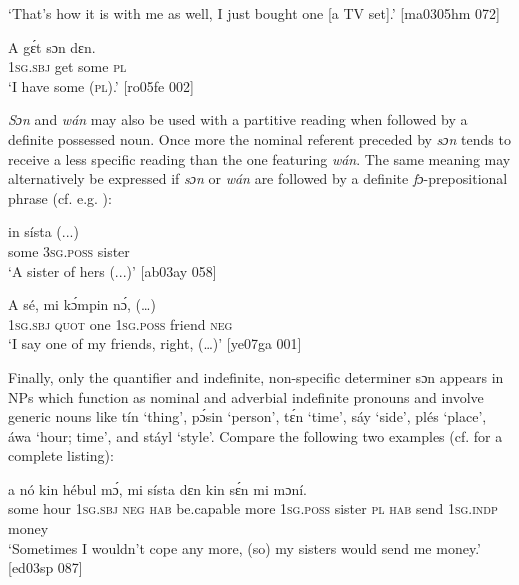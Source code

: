 \glt ‘That’s how it is with me as well, I just bought one [a TV set].’ [ma0305hm 072]
\z


\ea%
    \label{ex:key:187}
    \gll A    gɛ́t  sɔn    dɛn.\\
\textsc{1sg.sbj}  get  some  \textsc{pl}\\

\glt ‘I have some (\textsc{pl}).’ [ro05fe 002]
\z

\textit{Sɔn} and \textit{wán} may also be used with a partitive reading when followed by a definite possessed noun. Once more the nominal referent preceded by \textit{sɔn} tends to receive a less specific reading than the one featuring \textit{wán}. The same meaning may alternatively be expressed if \textit{sɔn} or \textit{wán} are followed by a definite \textit{fɔ}{}-prepositional phrase (cf. e.g. ):


\ea%
    \label{ex:key:188}
    \gll {}   in    sísta    (...)\\
some  \textsc{3sg.poss}  sister\\

\glt ‘A sister of hers (...)’ [ab03ay 058]
\z


\ea%
    \label{ex:key:189}
    \gll A    sé,        mi    kɔ́mpin  nɔ́,  (…)\\
\textsc{1sg.sbj}  \textsc{quot}    one    \textsc{1sg.poss}  friend  \textsc{neg}  \\

\glt ‘I say one of my friends, right, (…)’ [ye07ga 001]
\z

Finally, only the quantifier and indefinite, non-specific determiner sɔn appears in NPs which function as nominal and adverbial indefinite pronouns and involve generic noun{\fff}s like tín ‘thing’, pɔ́sin ‘person’, tɛ́n ‘time’, sáy ‘side’, plés ‘place’, áwa ‘hour; time’, and stáyl ‘style’. Compare the following two examples (cf.  for a complete listing):{\fff}


\ea%
    \label{ex:key:190}
    \gll {}     a    nó  kin  hébul    mɔ́,    mi
sísta    dɛn  kin  sɛ́n    mi    mɔní.\\
some  hour  \textsc{1sg.sbj}  \textsc{neg}  \textsc{hab}  be.capable  more  \textsc{1sg.poss}
sister  \textsc{pl}  \textsc{hab}  send  \textsc{1sg.indp}  money\\

\glt ‘Sometimes I wouldn’t cope any more, (so) my sisters would send me money.’ [ed03sp 087]
\z


